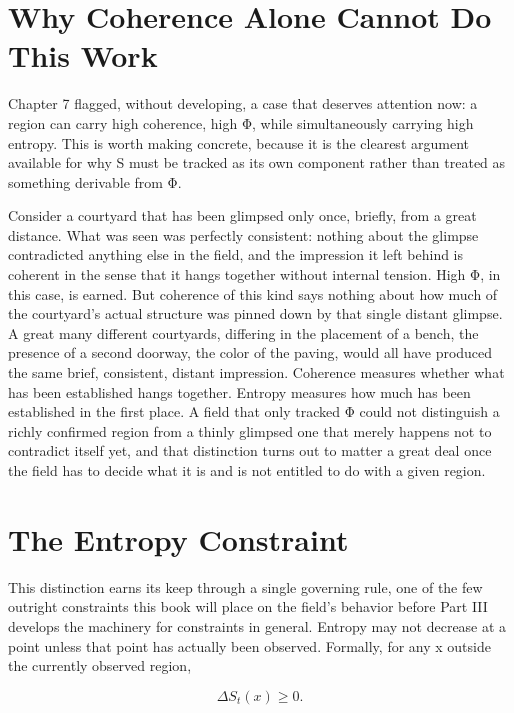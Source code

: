 \section{Why Coherence Alone Cannot Do This Work}

Chapter 7 flagged, without developing, a case that deserves attention now: a region can carry high coherence, high Φ, while simultaneously carrying high entropy. This is worth making concrete, because it is the clearest argument available for why S must be tracked as its own component rather than treated as something derivable from Φ.

Consider a courtyard that has been glimpsed only once, briefly, from a great distance. What was seen was perfectly consistent: nothing about the glimpse contradicted anything else in the field, and the impression it left behind is coherent in the sense that it hangs together without internal tension. High Φ, in this case, is earned. But coherence of this kind says nothing about how much of the courtyard's actual structure was pinned down by that single distant glimpse. A great many different courtyards, differing in the placement of a bench, the presence of a second doorway, the color of the paving, would all have produced the same brief, consistent, distant impression. Coherence measures whether what has been established hangs together. Entropy measures how much has been established in the first place. A field that only tracked Φ could not distinguish a richly confirmed region from a thinly glimpsed one that merely happens not to contradict itself yet, and that distinction turns out to matter a great deal once the field has to decide what it is and is not entitled to do with a given region.

\section{The Entropy Constraint}

This distinction earns its keep through a single governing rule, one of the few outright constraints this book will place on the field's behavior before Part III develops the machinery for constraints in general. Entropy may not decrease at a point unless that point has actually been observed. Formally, for any x outside the currently observed region,

\[ \Delta S_t(x) \ge 0. \]

